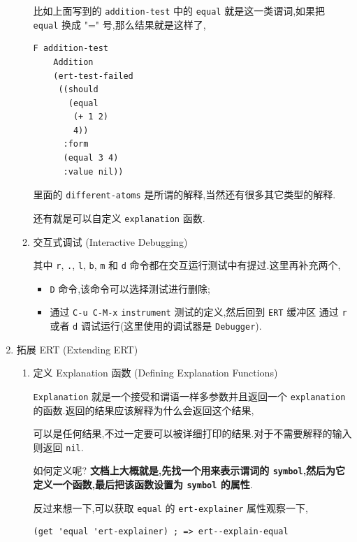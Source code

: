 \documentclass[11pt]{article}
\begin{document}
\begin{enumerate}
\begin{enumerate}
比如上面写到的 \texttt{addition-test} 中的 \texttt{equal} 就是这一类谓词,如果把 \texttt{equal} 换成 "=" 号,那么结果就是这样了,

\begin{verbatim}
F addition-test
    Addition
    (ert-test-failed
     ((should
       (equal
        (+ 1 2)
        4))
      :form
      (equal 3 4)
      :value nil))
\end{verbatim}

里面的 \texttt{different-atoms} 是所谓的解释,当然还有很多其它类型的解释.

还有就是可以自定义 \texttt{explanation} 函数.


\item 交互式调试 (Interactive Debugging)
\label{sec:orgbafd6e6}

其中 \texttt{r}, \texttt{.}, \texttt{l}, \texttt{b}, \texttt{m} 和 \texttt{d} 命令都在交互运行测试中有提过.这里再补充两个,

\begin{itemize}
\item \texttt{D} 命令,该命令可以选择测试进行删除;

\item 通过 \texttt{C-u C-M-x} \texttt{instrument} 测试的定义,然后回到 \texttt{ERT} 缓冲区 通过 \texttt{r} 或者 \texttt{d} 调试运行(这里使用的调试器是 \texttt{Debugger}).
\end{itemize}
\end{enumerate}


\item 拓展 ERT (Extending ERT)
\label{sec:orga2819a2}

\begin{enumerate}
\item 定义 Explanation 函数 (Defining Explanation Functions)
\label{sec:org8f4fa5c}

\texttt{Explanation} 就是一个接受和谓语一样多参数并且返回一个 \texttt{explanation} 的函数.返回的结果应该解释为什么会返回这个结果,

可以是任何结果,不过一定要可以被详细打印的结果.对于不需要解释的输入则返回 \texttt{nil}.

如何定义呢? \textbf{文档上大概就是,先找一个用来表示谓词的 \texttt{symbol},然后为它定义一个函数,最后把该函数设置为 \texttt{symbol} 的属性}.

反过来想一下,可以获取 \texttt{equal} 的 \texttt{ert-explainer} 属性观察一下,

\begin{verbatim}
(get 'equal 'ert-explainer) ; => ert--explain-equal
\end{verbatim}


\end{enumerate}
\end{enumerate}
\end{document}

